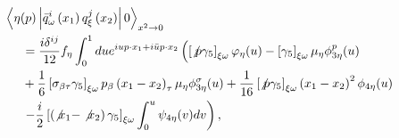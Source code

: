 \begin{equation}
    \begin{aligned}
         \left\langle\eta(p)\left|\bar{q}_\omega^i\left(x_1\right) q_{\xi}^j\left(x_2\right)\right| 0\right\rangle_{x^2 \rightarrow 0}                                                                                                      \\
         & \hspace{-4cm} = \frac{i \delta^{i j}}{12} f_\eta \int_0^1 d u e^{i u p \cdot x_1+i \bar{u} p \cdot x_2}\left(\left[\not p \gamma_5\right]_{\xi \omega} \varphi_\eta(u)-\left[\gamma_5\right]_{\xi \omega} \mu_\eta \phi_{3 \eta}^p(u)\right.    \\
         & \hspace{-4cm} +\frac{1}{6}\left[\sigma_{\beta \tau} \gamma_5\right]_{\xi \omega} p_\beta\left(x_1-x_2\right)_\tau \mu_\eta \phi_{3 \eta}^\sigma(u)+\frac{1}{16}\left[\not p \gamma_5\right]_{\xi \omega}\left(x_1-x_2\right)^2 \phi_{4 \eta}(u) \\
         & \hspace{-4cm} \left.-\frac{i}{2}\left[\left(\not x_1-\not x_2\right) \gamma_5\right]_{\xi \omega} \int_0^u \psi_{4 \eta}(v) d v\right),
    \end{aligned}
    \label{eq:DA_01}
\end{equation}

